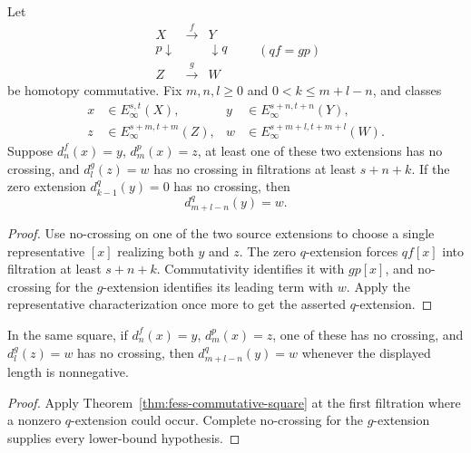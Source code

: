 \begin{theorem}
  \label{thm:fess-commutative-square}
  \notready
  Let
  \[
  \begin{array}{ccc}
    X&\xrightarrow{f}&Y\\
    \mathord{p}\downarrow&&\downarrow\mathord{q}\\
    Z&\xrightarrow{g}&W
  \end{array}
  \qquad(qf=gp)
  \]
  be homotopy commutative.  Fix $m,n,l\ge0$ and
  $0<k\le m+l-n$, and classes
  \[
  \begin{aligned}
    x&\in E_\infty^{s,t}(X),&
    y&\in E_\infty^{s+n,t+n}(Y),\\
    z&\in E_\infty^{s+m,t+m}(Z),&
    w&\in E_\infty^{s+m+l,t+m+l}(W).
  \end{aligned}
  \]
  Suppose $d_n^f(x)=y$, $d_m^p(x)=z$, at least one of these two extensions
  has no crossing, and $d_l^g(z)=w$ has no crossing in filtrations at least
  $s+n+k$.  If the zero extension $d_{k-1}^q(y)=0$ has no crossing, then
  \[
    d_{m+l-n}^q(y)=w.
  \]
\end{theorem}

\begin{proof}
  Use no-crossing on one of the two source extensions to choose a single
  representative $[x]$ realizing both $y$ and $z$.  The zero $q$-extension
  forces $qf[x]$ into filtration at least $s+n+k$.  Commutativity identifies
  it with $gp[x]$, and no-crossing for the $g$-extension identifies its leading
  term with $w$.  Apply the representative characterization once more to get
  the asserted $q$-extension.
\end{proof}

\begin{corollary}
  \label{cor:fess-square-naturality}
  \notready
  In the same square, if $d_n^f(x)=y$, $d_m^p(x)=z$, one of these has no
  crossing, and $d_l^g(z)=w$ has no crossing, then
  $d_{m+l-n}^q(y)=w$ whenever the displayed length is nonnegative.
\end{corollary}

\begin{proof}
  Apply Theorem~\ref{thm:fess-commutative-square} at the first filtration where
  a nonzero $q$-extension could occur.  Complete no-crossing for the
  $g$-extension supplies every lower-bound hypothesis.
\end{proof}


